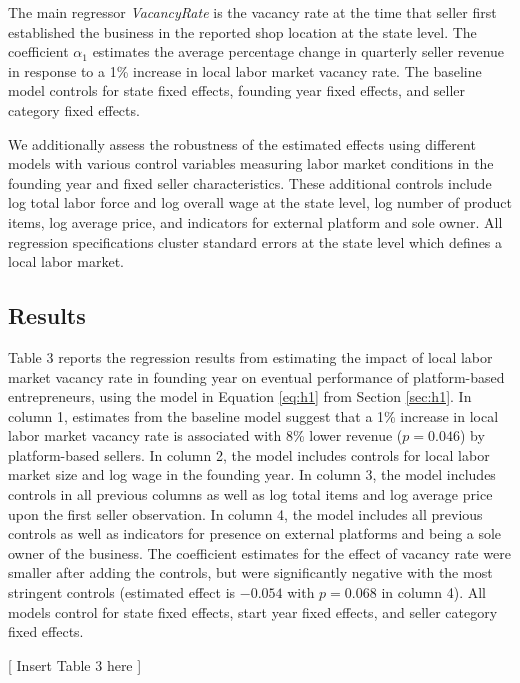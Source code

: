 \documentclass[letterpaper,12pt]{article}
\begin{document}
The main regressor \textit{VacancyRate} is the vacancy rate at the time that seller first established the business in the reported shop location at the state level. The coefficient $\alpha_{1}$ estimates the average percentage change in quarterly seller revenue in response to a 1\% increase in local labor market vacancy rate. The baseline model controls for state fixed effects, founding year fixed effects, and seller category fixed effects.

We additionally assess the robustness of the estimated effects using different models with various control variables measuring labor market conditions in the founding year and fixed seller characteristics. These additional controls include log total labor force and log overall wage at the state level, log number of product items, log average price, and indicators for external platform and sole owner. All regression specifications cluster standard errors at the state level which defines a local labor market. 


\subsection{Results}

Table 3 reports the regression results from estimating the impact of local labor market vacancy rate in founding year on eventual performance of platform-based entrepreneurs, using the model in Equation \ref{eq:h1} from Section \ref{sec:h1}. In column 1, estimates from the baseline model suggest that a 1\% increase in local labor market vacancy rate is associated with 8\% lower revenue ($p=0.046$) by platform-based sellers. In column 2, the model includes controls for local labor market size and log wage in the founding year. In column 3, the model includes controls in all previous columns as well as log total items and log average price upon the first seller observation. In column 4, the model includes all previous controls as well as indicators for presence on external platforms and being a sole owner of the business. The coefficient estimates for the effect of vacancy rate were smaller after adding the controls, but were significantly negative with the most stringent controls (estimated effect is $-0.054$ with $p=0.068$ in column 4). All models control for state fixed effects, start year fixed effects, and seller category fixed effects.


\begin{center}
[ Insert Table 3 here ]
\end{center}
\end{document}
